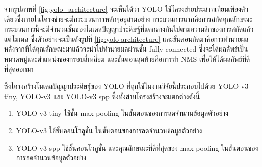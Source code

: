 จากรูปภาพที่ \ref{fig:yolo_architecture} จะเห็นได้ว่า YOLO ใช้โครงข่ายประสาทเทียมเพียงตัวเดียวซึ่งภายในโครงข่ายจะมีกระบวนการหลักๆอยู่สามอย่าง 
กระบวนการแรกคือการสกัดคุณลักษณะ กระบวนการนี้จะมีจำนวนชั้นของโมเดลปัญญาประดิษฐ์ที่แตกต่างกันไปตามความลึกของการสกัดแล้วแต่โมเดล ซึ่งตัวอย่างจะเป็นดังรูปที่ \ref{fig:yolo-architecture} 
และขั้นตอนถัดมาคือการทำนายผล หลังจากที่ได้คุณลักษณะมาแล้วจะนำไปทำนายผลผ่านชั้น fully connected ซึ่งจะได้ผลลัพธ์เป็นหมวดหมู่และตำแหน่งของกรอบสี่เหลี่ยม 
และขั้นตอนสุดท้ายคือการทำ NMS เพื่อให้ได้ผลลัพธ์ที่ดีที่สุดออกมา
\clearpage
\par ซึ่งโครงสร้างโมเดลปัญญาประดิษฐ์ของ YOLO ที่ถูกใช้ในงานวิจัยนี้ประกอบไปด้วย YOLO-v3 tiny, YOLO-v3 และ YOLO-v3 spp ซึ่งทั้งสามโครงสร้างจะแตกต่างดังนี้
\begin{enumerate}
	\setlength\itemsep{-0.25em}
	\item YOLO-v3 tiny ใช้ชั้น max pooling ในขั้นตอนของการลดจำนวนข้อมูลตัวอย่าง
	\item YOLO-v3 ใช้ชั้นคอนโวลูชั่น ในขั้นตอนของการลดจำนวนข้อมูลตัวอย่าง
	\item YOLO-v3 spp ใช้ชั้นคอนโวลูชั่น และคุณลักษณะที่ดีที่สุดของ max pooling ในขั้นตอนของการลดจำนวนข้อมูลตัวอย่าง
\end{enumerate}

